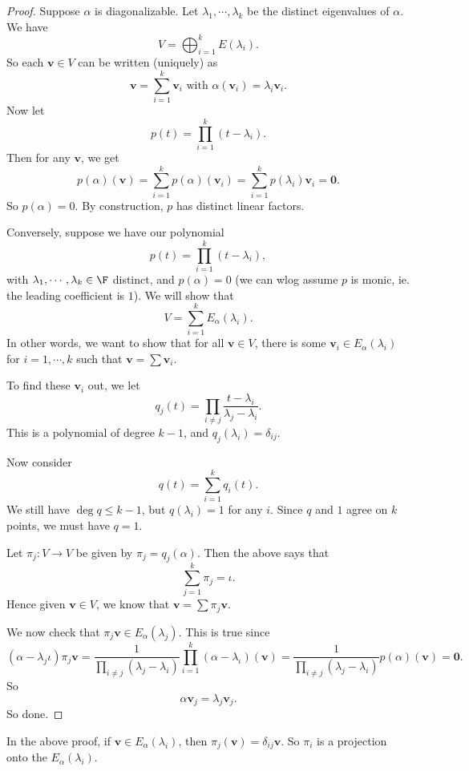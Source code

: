 \documentclass[a4paper]{article}
\begin{document}
\begin{proof}
  Suppose $\alpha$ is diagonalizable. Let $\lambda_1, \cdots, \lambda_k$ be the distinct eigenvalues of $\alpha$. We have
  \[
    V = \bigoplus_{i = 1}^k E(\lambda_i).
  \]
  So each $\mathbf{v} \in V$ can be written (uniquely) as
  \[
    \mathbf{v} = \sum_{i = 1}^k \mathbf{v}_i \text{ with }\alpha(\mathbf{v}_i) = \lambda_i \mathbf{v}_i.
  \]
  Now let
  \[
    p(t) = \prod_{i = 1}^k (t - \lambda_i).
  \]
  Then for any $\mathbf{v}$, we get
  \[
    p(\alpha) (\mathbf{v}) = \sum_{i = 1}^k p(\alpha) (\mathbf{v}_i) = \sum_{i = 1}^k p(\lambda_i) \mathbf{v}_i = \mathbf{0}.
  \]
  So $p(\alpha) = 0$. By construction, $p$ has distinct linear factors.

  Conversely, suppose we have our polynomial
  \[
    p(t) = \prod_{i = 1}^k (t - \lambda_i),
  \]
  with $\lambda_1, \cdots, \lambda_k \in \F$ distinct, and $p(\alpha) = 0$ (we can wlog assume $p$ is monic, ie. the leading coefficient is $1$). We will show that
  \[
    V = \sum_{i = 1}^k E_\alpha(\lambda_i).
  \]
  In other words, we want to show that for all $\mathbf{v} \in V$, there is some $\mathbf{v}_i \in E_\alpha(\lambda_i)$ for $i = 1, \cdots, k$ such that $\mathbf{v} = \sum \mathbf{v}_i$.

  To find these $\mathbf{v}_i$ out, we let
  \[
    q_j(t) = \prod_{i \not= j} \frac{t - \lambda_i}{\lambda_j - \lambda_i}.
  \]
  This is a polynomial of degree $k - 1$, and $q_j(\lambda_i) = \delta_{ij}$.

  Now consider
  \[
    q(t) = \sum_{i = 1}^k q_i(t).
  \]
  We still have $\deg q \leq k - 1$, but $q(\lambda_i) = 1$ for any $i$. Since $q$ and $1$ agree on $k$ points, we must have $q = 1$.

  Let $\pi_j: V\to V$ be given by $\pi_j = q_j(\alpha)$. Then the above says that
  \[
    \sum_{j = 1}^k \pi_j = \iota.
  \]
  Hence given $\mathbf{v} \in V$, we know that $\mathbf{v} = \sum \pi_j \mathbf{v}$.

  We now check that $\pi_j \mathbf{v} \in E_\alpha (\lambda_j)$. This is true since
  \[
    (\alpha - \lambda_j\iota) \pi_j \mathbf{v} =\frac{1}{\prod_{i \not= j}(\lambda_j - \lambda_i)} \prod_{i = 1}^k (\alpha - \lambda_\iota) (\mathbf{v}) = \frac{1}{\prod_{i \not= j}(\lambda_j - \lambda_i)} p(\alpha) (\mathbf{v}) = \mathbf{0}.
  \]
  So
  \[
    \alpha \mathbf{v}_j = \lambda_j \mathbf{v}_j.
  \]
  So done.
\end{proof}
In the above proof, if $\mathbf{v} \in E_\alpha(\lambda_i)$, then $\pi_j(\mathbf{v}) = \delta_{ij}\mathbf{v}$. So $\pi_i$ is a projection onto the $E_\alpha(\lambda_i)$.
\end{document}
